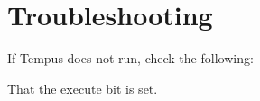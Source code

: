 \section{Troubleshooting}

If Tempus does not run, check the following:

That the execute bit is set.
